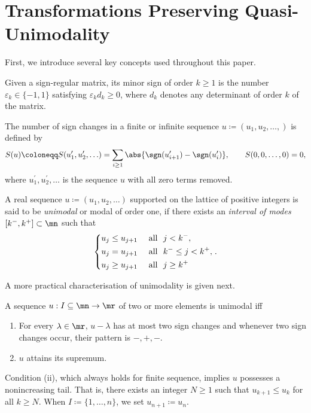 \documentclass[11pt]{article}
\begin{document}
	
	
	
	
	
	\section{Transformations Preserving Quasi-Unimodality }\label{sec2}
	
	First, we introduce several key concepts used throughout this paper.
		\begin{define}
		Given a sign-regular matrix, its  minor sign of order $k \ge 1$  is the number $\varepsilon_k \in \{-1, 1\}$ satisfying $\varepsilon_k d_k \ge 0$, where $d_k$ denotes any determinant of order $k$ of the matrix.
	\end{define}
	
	\begin{define}\label{def.sign.chg}
		The number of sign changes in a finite or infinite sequence $u \coloneqq (u_1, u_2, \ldots,)$ is defined by
		\begin{equation*}
			S(u)  \coloneqq  S(u^\prime_{1},u^\prime_{2}, \ldots) = \sum_{i \ge 1} \abs{\sgn(u^\prime_{i+1})-\sgn(u^\prime_i)},\qquad S(0, 0, \ldots, 0) =0,
		\end{equation*}	
		where $u^\prime_1, u^\prime_{2}, \ldots$  is the sequence $u$  with all zero terms removed.
	\end{define}

	\begin{define}\label{def.unimodel}
		A   real  sequence $u \coloneqq (u_1, u_2, \ldots)$  supported on the lattice of positive integers is said to be 
		\textit{unimodal} or modal of order one, if there exists an \textit{interval of modes}
		$[k^-, k^+] \subset \mn$ such that
		\begin{equation}\label{def.condition.multimodel.sequence1}%
			\begin{dcases}
				u_{j} \le  u_{j+1} &~ \text{all } ~ j  <  k^-,\\
				u_{j} =  u_{j+1} &~ \text{all } ~  k^- \le j  < k^+,\\
				u_{j} \ge  u_{j+1} &~ \text{all } ~  j \ge k^+
			\end{dcases}.
		\end{equation}
	\end{define}	
	A more practical characterisation of unimodality is given next.
	\begin{lemma}[\cite{ZD4}]\label{lem.sign.chg}
		A  sequence $u : I \subseteq \mn \to \mr$ of two or more elements is unimodal iff
		\begin{enumerate}[label=\rm(\roman*)]
			\item For every $\lambda \in \mr$, $u-\lambda$ has at most two sign changes and whenever two sign changes occur,  their pattern is  $-, +, -$.
				\item $u$ attains its supremum.
		\end{enumerate}
	\end{lemma}	
Condition \rm(ii), which always holds for finite sequence, implies $u$ possesses a nonincreasing tail. That is, there exists an integer $N \ge 1$ such that $u_{k+1} \le u_{k}$ for all $k \ge N$. When $I \coloneq \{ 1, \ldots, n \}$, we set $u_{n+1}\coloneqq u_n$.  
\end{document}
